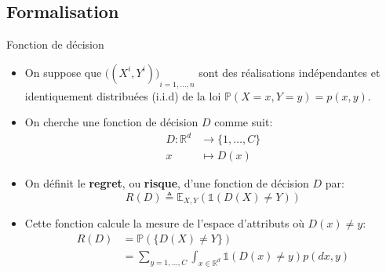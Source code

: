 \documentclass[8pt]{beamer}
\begin{document}
		\subsection{Formalisation}
			\begin{frame}{Fonction de décision}
				\begin{itemize}
					\item<1-> On suppose que ${\big((X^i, Y^i)\big)}_{i=1,\dots,n}$ sont des réalisations indépendantes et identiquement distribuées (i.i.d) de la loi $\mathbb{P}(X=x, Y=y) = p(x,y)$.
					\item<2-> On cherche une fonction de décision $D$ comme suit:
					\begin{align*}
						D: \mathbb{R}^d &\rightarrow \{1, \dots, C\} \\
						x &\mapsto D(x)
					\end{align*}
					\item<3-> On définit le \textbf{regret}, ou \textbf{risque}, d'une fonction de décision $D$ par:
					\begin{equation}
						R(D) \triangleq \mathbb{E}_{X,Y}(\mathbb{1}(D(X)\neq Y))
					\end{equation}
					\item<4-> Cette fonction calcule la mesure de l'espace d'attributs où $D(x) \neq y$:
					\begin{align*}
						R(D) &= \mathbb{P}(\{D(X)\neq Y\})\\
							&= \sum_{y = 1, \dots, C} \int_{x \in \mathbb{R}^d} \mathbb{1}(D(x)\neq y) p(dx, y)
					\end{align*}
				\end{itemize}
			\end{frame}
\end{document}
